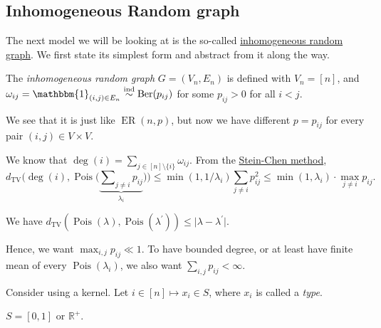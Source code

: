 \subsection{Inhomogeneous Random graph}
The next model we will be looking at is the so-called \hyperref[def:inhomogeneous-random-graph]{inhomogeneous random graph}. We first state its simplest form and abstract from it along the way.

\begin{definition}\label{def:inhomogeneous-random-graph}
	The \emph{inhomogeneous random graph} \(G = (V_n, E_n)\) is defined with \(V_n = [n]\), and \(\omega _{ij} = \mathbbm{1}_{(i, j) \in E_n} \overset{\text{ind} }{\sim } \operatorname{Ber}(p_{ij}) \) for some \(p_{ij} > 0\) for all \(i < j\).
\end{definition}

We see that it is just like \(\operatorname{ER}(n, p) \), but now we have different \(p = p_{ij} \) for every pair \((i, j) \in V \times V\).

\begin{prev}
	We know that \(\deg (i) = \sum_{j \in [n] \setminus \{ i \} } \omega _{ij}\). From the \hyperref[thm:Stein-Chen-method]{Stein-Chen method},
	\[
		d_{\mathrm{TV} }\Big(\deg (i) , \operatorname{Pois}\big(\underbrace{\sum\nolimits_{j \neq i} p_{ij}}_{\lambda _i} \big) \Big)
		\leq \min (1 , 1 / \lambda _i) \sum_{j \neq i} p_{ij}^2
		\leq \min (1, \lambda _i) \cdot \max _{j \neq i} p_{ij}.
	\]
\end{prev}

\begin{note}
	We have \(d_{\mathrm{TV} }(\operatorname{Pois}(\lambda ) , \operatorname{Pois}(\lambda ^{\prime} ) ) \leq \lvert \lambda - \lambda ^{\prime} \rvert \).
\end{note}

Hence, we want \(\max _{i, j} p_{ij} \ll 1\). To have bounded degree, or at least have finite mean of every \(\operatorname{Pois}(\lambda _i) \), we also want \(\sum_{i, j} p_{ij} < \infty \).

Consider using a kernel. Let \(i \in [n] \mapsto x_i \in S\), where \(x_i\) is called a \emph{type}.

\begin{eg}
	\(S = [0, 1]\) or \(\mathbb{R} ^+\).
\end{eg}

